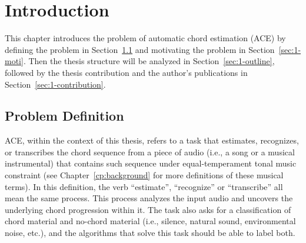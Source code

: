 

\chapter{Introduction}\label{cp:intro}

\ifpdf
    \graphicspath{{X/figures/PNG/}{X/figures/PDF/}{X/figures/}}
\else
    \graphicspath{{X/figures/EPS/}{X/figures/}}
\fi





This chapter introduces the problem of automatic chord estimation (ACE) by defining the problem in Section~\ref{sec:1-problemdef} and motivating the problem in Section~\ref{sec:1-moti}. Then the thesis structure will be analyzed in Section~\ref{sec:1-outline}, followed by the thesis contribution and the author's publications in Section~\ref{sec:1-contribution}.

\section{Problem Definition} \label{sec:1-problemdef}
ACE, within the context of this thesis, refers to a task that estimates, recognizes, or transcribes the chord sequence from a piece of audio (i.e., a song or a musical instrumental) that contains such sequence under equal-temperament tonal music constraint (see Chapter~\ref{cp:background} for more definitions of these musical terms). In this definition, the verb ``estimate'', ``recognize'' or ``transcribe'' all mean the same process. This process analyzes the input audio and uncovers the underlying chord progression within it. The task also asks for a classification of chord material and no-chord material (i.e., silence, natural sound, environmental noise, etc.), and the algorithms that solve this task should be able to label both.

